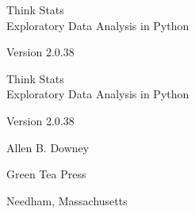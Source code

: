 \documentclass[12pt]{book}
\newcommand{\thetitle}{Think Stats}
\newcommand{\thesubtitle}{Exploratory Data Analysis in Python}
\newcommand{\theversion}{2.0.38}
\begin{document}
\begin{latexonly}

\renewcommand{\blankpage}{\thispagestyle{empty} \quad \newpage}



\thispagestyle{empty}

\begin{flushright}
\vspace*{2.0in}

\begin{spacing}{3}
{\huge \thetitle}\\
{\Large \thesubtitle }
\end{spacing}

\vspace{0.25in}

Version \theversion

\vfill

\end{flushright}


\blankpage
\blankpage

\pagebreak
\thispagestyle{empty}

\begin{flushright}
\vspace*{2.0in}

\begin{spacing}{3}
{\huge \thetitle}\\
{\Large \thesubtitle}
\end{spacing}

\vspace{0.25in}

Version \theversion

\vspace{1in}


{\Large
Allen B. Downey\\
}


\vspace{0.5in}

{\Large Green Tea Press}

{\small Needham, Massachusetts}

\vfill


\end{flushright}
\end{latexonly}
\end{document}
